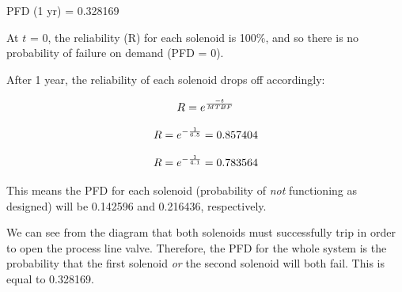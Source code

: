 PFD (1 yr) = 0.328169







At $t$ = 0, the reliability (R) for each solenoid is 100\%, and so there is no probability of failure on demand (PFD = 0).

\vskip 10pt

After 1 year, the reliability of each solenoid drops off accordingly:

$$R = e ^{- t \over MTBF}$$

$$R = e ^{- {1 \over 6.5}} = 0.857404$$

$$R = e ^{- {1 \over 4.1}} = 0.783564$$

This means the PFD for each solenoid (probability of {\it not} functioning as designed) will be 0.142596 and 0.216436, respectively.

\vskip 10pt

We can see from the diagram that both solenoids must successfully trip in order to open the process line valve.  Therefore, the PFD for the whole system is the probability that the first solenoid {\it or} the second solenoid will both fail.  This is equal to 0.328169.





